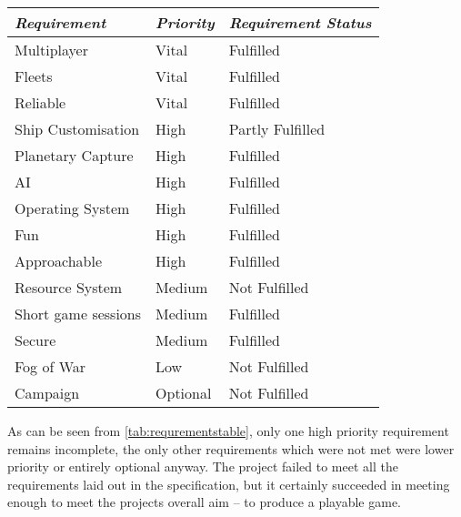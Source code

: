 \begin{table*}[ht]
	\begin{tabular}{p{10em} p{6em} p{12em}}
		\toprule
		\emph{Requirement} & \emph{Priority} & \emph{Requirement Status}\\
		\midrule
   Multiplayer & Vital & Fulfilled\\
	Fleets & Vital &  Fulfilled \\
	Reliable & Vital & Fulfilled\\
	
	Ship Customisation & High & Partly Fulfilled\\
   Planetary Capture & High & Fulfilled \\
   AI & High & Fulfilled \\
	
   Operating System & High & Fulfilled\\
	Fun & High & Fulfilled\\
	Approachable & High & Fulfilled\\
	Resource System & Medium & Not Fulfilled \\
	Short game sessions & Medium & Fulfilled\\
   Secure & Medium & Fulfilled\\
	Fog of War & Low & Not Fulfilled \\
	Campaign & Optional & Not Fulfilled\\

	\bottomrule
	\end{tabular}
	\caption{Requrement fullfillment}
	\label{tab:requrementstable}
\end{table*}

\vspace{5mm}

As can be seen from \ref{tab:requrementstable}, only one high priority requirement remains incomplete, the only other requirements which were not met were lower priority or entirely optional anyway. The project failed to meet all the requirements laid out in the specification, but it certainly succeeded in meeting enough to meet the projects overall aim -- to produce a playable game.